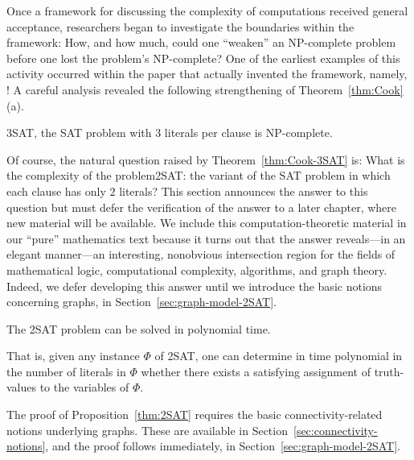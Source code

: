 {Once a framework for discussing the complexity of computations received general acceptance, researchers began to investigate the boundaries within the framework: How, and how much, could one ``weaken'' an {\sf NP}-complete problem before one lost the problem's {\sf NP}-complete?  One of the earliest examples of this activity occurred within the paper that actually invented the framework, namely, \cite{Cook71}!  A careful analysis revealed the following strengthening of Theorem~\ref{thm:Cook}(a).

\begin{theorem}
\label{thm:Cook-3SAT}
{\sf 3SAT}, the {\sf SAT} problem with $3$ literals per clause is {\sf NP}-complete.
\end{theorem}


Of course, the natural question raised by Theorem~\ref{thm:Cook-3SAT} is: What is the complexity of the problem{\sf 2SAT}: the variant  of the {\sf SAT} problem in which each clause has only $2$ literals?  This section announces the answer to this question but must defer the verification of the answer to a later chapter, where new material will be available.  We include this computation-theoretic material in our ``pure'' mathematics text because it turns out that the answer reveals---in an elegant manner---an interesting, nonobvious intersection region for the fields of mathematical logic, computational complexity, algorithms, and graph theory.  Indeed, we defer developing this answer until we  introduce the basic notions concerning graphs, in
Section~\ref{sec:graph-model-2SAT}.

\begin{prop}
\label{thm:2SAT}
The {\sf 2SAT} problem can be solved in polynomial time.

\noindent
That is, given any instance $\Phi$ of {\sf 2SAT}, one can determine in time polynomial in the number of literals in $\Phi$ whether there exists a satisfying assignment of truth-values to the variables of $\Phi$.
\end{prop}

The proof of Proposition~\ref{thm:2SAT} requires the basic connectivity-related notions underlying graphs.  
These are available in Section~\ref{sec:connectivity-notions}, and the proof follows immediately, in Section~\ref{sec:graph-model-2SAT}.

}

